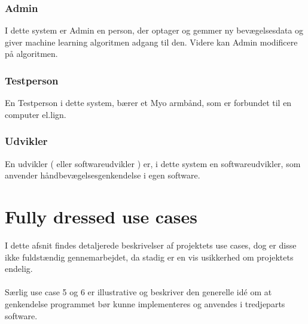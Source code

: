 \subsubsection*{Admin}
I dette system er Admin en person, der optager og gemmer ny bevægelsesdata og giver machine learning algoritmen adgang til den. Videre kan Admin modificere på algoritmen.

\subsubsection*{Testperson}
En Testperson i dette system, bærer et Myo armbånd, som er forbundet til en computer el.lign.   

\subsubsection*{Udvikler}
En udvikler ( eller softwareudvikler ) er, i dette system en softwareudvikler, som anvender håndbevægelsesgenkendelse i egen software.  

\section{Fully dressed use cases}
I dette afsnit findes detaljerede beskrivelser af projektets use cases, dog er disse ikke fuldstændig gennemarbejdet, da stadig er en vis usikkerhed om projektets endelig.
\\ \\Særlig use case 5 og 6 er illustrative og beskriver den generelle idé om at genkendelse programmet bør kunne implementeres og anvendes i tredjeparts software.
